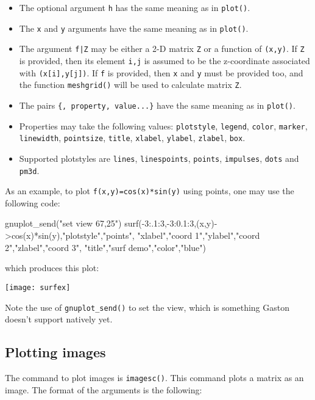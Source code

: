 \documentclass[11pt]{article}
\newcommand{\cmd}[1]{\texttt{#1}}
\begin{document}
\begin{itemize}
	\item The optional argument \cmd{h} has the same meaning as in
		\cmd{plot()}.
	\item The \cmd{x} and \cmd{y} arguments have the same meaning as in
		\cmd{plot()}.
	\item The argument \cmd{f|Z} may be either a 2-D matrix \cmd{Z} or a
		function of \cmd{(x,y)}. If \cmd{Z} is provided, then its element
		\cmd{i,j} is assumed to be the z-coordinate associated with
		\cmd{(x[i],y[j])}. If \cmd{f} is provided, then \cmd{x} and \cmd{y} must
		be provided too, and the function \cmd{meshgrid()} will be used to
		calculate matrix \cmd{Z}.
	\item The pairs \cmd{\{, property, value...\}} have the same meaning as in
		\cmd{plot()}.
	\item Properties may take the following values: \cmd{plotstyle},
		\cmd{legend}, \cmd{color}, \cmd{marker}, \cmd{linewidth},
		\cmd{pointsize}, \cmd{title}, \cmd{xlabel}, \cmd{ylabel}, \cmd{zlabel},
		\cmd{box}.
	\item Supported plotstyles are \cmd{lines}, \cmd{linespoints},
		\cmd{points}, \cmd{impulses}, \cmd{dots} and \cmd{pm3d}.
\end{itemize}

As an example, to plot \cmd{f(x,y)=cos(x)*sin(y)} using points, one may use the
following code:

\begin{juliacode}
gnuplot_send("set view 67,25")
surf(-3:.1:3,-3:0.1:3,(x,y)->cos(x)*sin(y),"plotstyle","points",
"xlabel","coord 1","ylabel","coord 2","zlabel","coord 3",
"title","surf demo","color","blue")
\end{juliacode}

\noindent which produces this plot:

\begin{center}
\texttt{[image: surfex]}
\end{center}

Note the use of \cmd{gnuplot\_send()} to set the view, which is something Gaston
doesn't support natively yet.

\subsection{Plotting images}

The command to plot images is \cmd{imagesc()}. This command plots a matrix as an
image. The format of the arguments is the following:
\end{document}

